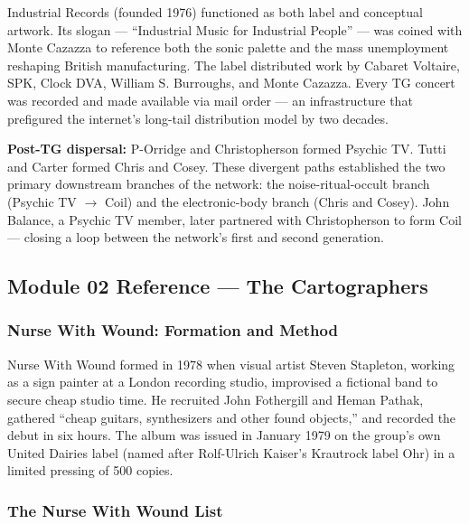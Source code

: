 \documentclass[11pt,letterpaper]{article}
\begin{document}
Industrial Records (founded 1976) functioned as both label and conceptual artwork. Its slogan —
``Industrial Music for Industrial People'' — was coined with Monte Cazazza to reference both
the sonic palette and the mass unemployment reshaping British manufacturing. The label distributed
work by Cabaret Voltaire, SPK, Clock DVA, William S. Burroughs, and Monte Cazazza. Every TG
concert was recorded and made available via mail order — an infrastructure that prefigured
the internet's long-tail distribution model by two decades.

\textbf{Post-TG dispersal:} P-Orridge and Christopherson formed Psychic TV. Tutti and Carter
formed Chris and Cosey. These divergent paths established the two primary downstream branches
of the network: the noise-ritual-occult branch (Psychic TV $\to$ Coil) and the electronic-body
branch (Chris and Cosey). John Balance, a Psychic TV member, later partnered with Christopherson
to form Coil — closing a loop between the network's first and second generation.

\subsection{Module 02 Reference --- The Cartographers}

\subsubsection{Nurse With Wound: Formation and Method}

Nurse With Wound formed in 1978 when visual artist Steven Stapleton, working as a sign painter
at a London recording studio, improvised a fictional band to secure cheap studio time. He recruited
John Fothergill and Heman Pathak, gathered ``cheap guitars, synthesizers and other found objects,''
and recorded the debut in six hours. The album was issued in January 1979 on the group's own
United Dairies label (named after Rolf-Ulrich Kaiser's Krautrock label Ohr) in a limited pressing
of 500 copies.

\subsubsection{The Nurse With Wound List}
\end{document}
